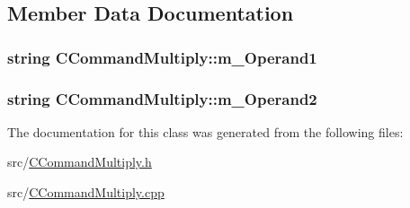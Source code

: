 \subsection{Member Data Documentation}
\subsubsection[{\texorpdfstring{m\+\_\+\+Operand1}{m_Operand1}}]{\setlength{\rightskip}{0pt plus 5cm}string C\+Command\+Multiply\+::m\+\_\+\+Operand1\hspace{0.3cm}{\ttfamily [private]}}\hypertarget{classCCommandMultiply_a41c3f181f0ee844a3afaba12a96c4502}{}\label{classCCommandMultiply_a41c3f181f0ee844a3afaba12a96c4502}
\subsubsection[{\texorpdfstring{m\+\_\+\+Operand2}{m_Operand2}}]{\setlength{\rightskip}{0pt plus 5cm}string C\+Command\+Multiply\+::m\+\_\+\+Operand2\hspace{0.3cm}{\ttfamily [private]}}\hypertarget{classCCommandMultiply_a213170d1398739645e55e5e841fff405}{}\label{classCCommandMultiply_a213170d1398739645e55e5e841fff405}


The documentation for this class was generated from the following files\+:\begin{DoxyCompactItemize}
\item 
src/\hyperlink{CCommandMultiply_8h}{C\+Command\+Multiply.\+h}\item 
src/\hyperlink{CCommandMultiply_8cpp}{C\+Command\+Multiply.\+cpp}\end{DoxyCompactItemize}
